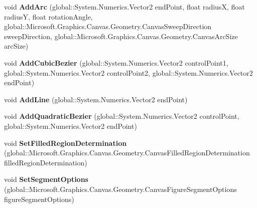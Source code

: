 \begin{DoxyCompactItemize}
void {\bfseries Add\+Arc} (global\+::\+System.\+Numerics.\+Vector2 end\+Point, float radiusX, float radiusY, float rotation\+Angle, global\+::\+Microsoft.\+Graphics.\+Canvas.\+Geometry.\+Canvas\+Sweep\+Direction sweep\+Direction, global\+::\+Microsoft.\+Graphics.\+Canvas.\+Geometry.\+Canvas\+Arc\+Size arc\+Size)
\item 
\mbox{\label{interface_microsoft_1_1_graphics_1_1_canvas_1_1_geometry_1_1_i_canvas_path_receiver_ab770bd039e07f19239a6f9f563ccd042}} 
void {\bfseries Add\+Cubic\+Bezier} (global\+::\+System.\+Numerics.\+Vector2 control\+Point1, global\+::\+System.\+Numerics.\+Vector2 control\+Point2, global\+::\+System.\+Numerics.\+Vector2 end\+Point)
\item 
\mbox{\label{interface_microsoft_1_1_graphics_1_1_canvas_1_1_geometry_1_1_i_canvas_path_receiver_af4c3299bef8e5d0a0d801f7e730857f9}} 
void {\bfseries Add\+Line} (global\+::\+System.\+Numerics.\+Vector2 end\+Point)
\item 
\mbox{\label{interface_microsoft_1_1_graphics_1_1_canvas_1_1_geometry_1_1_i_canvas_path_receiver_a782bc874c27fca70636c3657fbd63fb8}} 
void {\bfseries Add\+Quadratic\+Bezier} (global\+::\+System.\+Numerics.\+Vector2 control\+Point, global\+::\+System.\+Numerics.\+Vector2 end\+Point)
\item 
\mbox{\label{interface_microsoft_1_1_graphics_1_1_canvas_1_1_geometry_1_1_i_canvas_path_receiver_a0bcd3e4a427ddf33e3454ce466e35bec}} 
void {\bfseries Set\+Filled\+Region\+Determination} (global\+::\+Microsoft.\+Graphics.\+Canvas.\+Geometry.\+Canvas\+Filled\+Region\+Determination filled\+Region\+Determination)
\item 
\mbox{\label{interface_microsoft_1_1_graphics_1_1_canvas_1_1_geometry_1_1_i_canvas_path_receiver_a5492b54121b4ffc412071f8844a3b6aa}} 
void {\bfseries Set\+Segment\+Options} (global\+::\+Microsoft.\+Graphics.\+Canvas.\+Geometry.\+Canvas\+Figure\+Segment\+Options figure\+Segment\+Options)

\end{DoxyCompactItemize}
